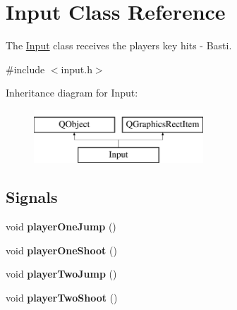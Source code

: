 \hypertarget{class_input}{}\section{Input Class Reference}
\label{class_input}


The \hyperlink{class_input}{Input} class receives the players\textquotesingle{} key hits -\/ Basti.  




{\ttfamily \#include $<$input.\+h$>$}

Inheritance diagram for Input\+:\begin{figure}[H]
\begin{center}
\leavevmode
\includegraphics[height=2.000000cm]{class_input}
\end{center}
\end{figure}
\subsection*{Signals}
\begin{DoxyCompactItemize}
\item 
void {\bfseries player\+One\+Jump} ()\hypertarget{class_input_a3c56e6c2e6960014a56835cab6298d20}{}\label{class_input_a3c56e6c2e6960014a56835cab6298d20}

\item 
void {\bfseries player\+One\+Shoot} ()\hypertarget{class_input_a90a64a89b4d9804ed16c6141e9946a58}{}\label{class_input_a90a64a89b4d9804ed16c6141e9946a58}

\item 
void {\bfseries player\+Two\+Jump} ()\hypertarget{class_input_ad7689c70cb0680ed838db073af088c0a}{}\label{class_input_ad7689c70cb0680ed838db073af088c0a}

\item 
void {\bfseries player\+Two\+Shoot} ()\hypertarget{class_input_af8eba659f268b7cb19558c5a2bd40d17}{}\label{class_input_af8eba659f268b7cb19558c5a2bd40d17}

\end{DoxyCompactItemize}
